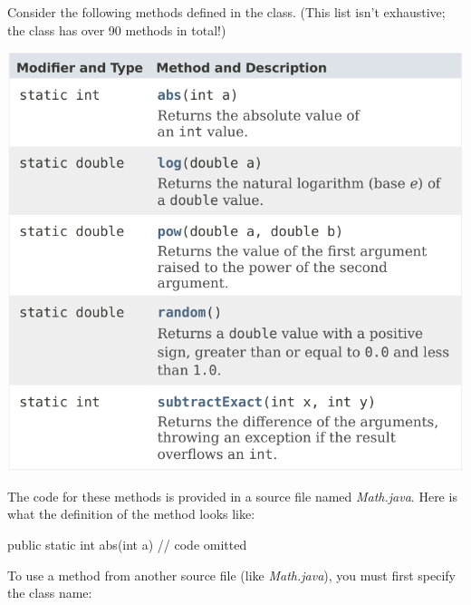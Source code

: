 
Consider the following methods defined in the  class.
(This list isn't exhaustive; the  class has over 90 methods in total!)

\begin{center}
\includegraphics[scale=0.90]{math-javadoc.pdf}
\end{center}

The code for these methods is provided in a source file named {\it Math.java}.
Here is what the definition of the  method looks like:

\smallskip
\begin{javalst}
    public static int abs(int a) {
        // code omitted
    }
\end{javalst}
\smallskip

%

To use a method from another source file (like {\it Math.java}), you must first specify the class name:


